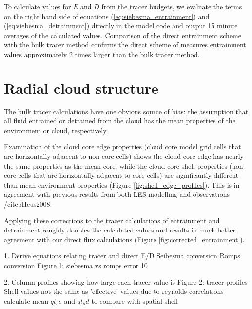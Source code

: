 \documentclass[draft,grl]{AGUTeX}
\begin{document}
\begin{article}


To calculate values for $E$ and $D$ from the tracer budgets, we evaluate the 
terms on the right hand side of equations (\ref{eq:siebesma_entrainment}) and 
(\ref{eq:siebesma_detrainment}) directly in the model code and output 15 minute averages 
of the calculated values.  Comparison of the direct entrainment scheme with the 
bulk tracer method confirms the direct scheme of \cite{Romps2010} measures 
entrainment values approximately 2 times larger than the bulk tracer method.


\section{Radial cloud structure}

The bulk tracer calculations have one obvious source of bias: the assumption 
that all fluid entrained or detrained from the cloud has the mean properties of 
the environment or cloud, respectively.  

Examination of the cloud core edge properties (cloud core model grid cells 
that are horizontally adjacent to non-core cells) shows the cloud core edge has 
nearly the same properties as the mean core, while the cloud core shell 
properties (non-core cells that are horizontally adjacent to core cells) 
are significantly different than mean environment properties (Figure 
\ref{fig:shell_edge_profiles}).  This is in agreement with previous results 
from both LES modelling and observations /citep{Heus2008}.





Applying these corrections to the tracer calculations of entrainment and 
detrainment roughly doubles the calculated values and results in much better 
agreement with our direct flux calculations (Figure 
\ref{fig:corrected_entrainment}).



1. Derive equations relating tracer and direct E/D
  Seibesma conversion
  Romps conversion
	Figure 1: siebesma vs romps error
  10%

2. Column profiles showing how large each tracer value is
    Figure 2: tracer profiles
    Shell values not the same as 'effective' values due to reynolds correlations
    calculate mean $qt_se$ and $qt_sd$ to compare with spatial shell


\end{article}
\end{document}
